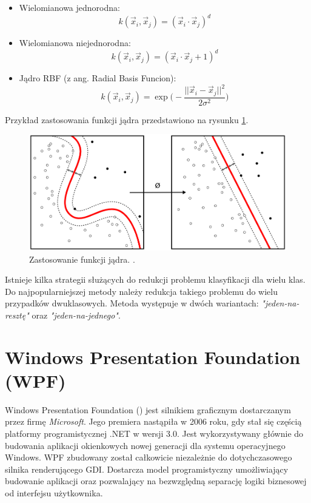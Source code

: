\begin{itemize}
	\item Wielomianowa jednorodna: 
	\begin{equation}
	k(\vec{x}_i,\vec{x}_j) = (\vec{x}_i \cdot \vec{x}_j)^d
	\end{equation}
	\item Wielomianowa niejednorodna:
	\begin{equation}
	k(\vec{x}_i,\vec{x}_j) = (\vec{x}_i \cdot \vec{x}_j + 1)^d
	\end{equation}
	\item Jądro RBF (z ang. Radial Basis Funcion):
	\begin{equation}
	k(\vec{x}_i,\vec{x}_j) = \exp\bigg( -\frac{||\vec{x}_i - \vec{x}_j||^2}{2\sigma^2}\bigg)
	\end{equation}
\end{itemize}
Przykład zastosowania funkcji jądra przedstawiono na rysunku \ref{im: KernelMachine}.
\begin{figure}[h]
	\includegraphics[width=12cm]{KernelMachine}
	\centering
	\caption{Zastosowanie funkcji jądra. \cite{Svm}.}
	\label{im: KernelMachine}
\end{figure}

Istnieje kilka strategii służących do redukcji problemu klasyfikacji dla wielu klas. Do najpopularniejszej metody należy redukcja takiego problemu do wielu przypadków dwuklasowych. Metoda występuje w dwóch wariantach: \textit{"jeden-na-resztę"} oraz \textit{"jeden-na-jednego"}. 


\section{Windows Presentation Foundation (WPF)}
\label{sec: WPF}
Windows Presentation Foundation (\cite{Wpf}) jest silnikiem graficznym dostarczanym przez firmę \textit{Microsoft}. Jego premiera nastąpiła w 2006 roku, gdy stał się częścią platformy programistycznej .NET w wersji 3.0.  Jest wykorzystywany głównie do budowania aplikacji okienkowych nowej generacji dla systemu operacyjnego Windows. WPF zbudowany został całkowicie niezależnie do dotychczasowego silnika renderującego GDI. Dostarcza model programistyczny umożliwiający budowanie aplikacji oraz pozwalający na bezwzględną separację logiki biznesowej od interfejsu użytkownika. 

